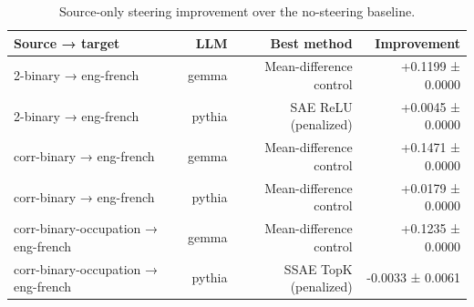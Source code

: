 \begin{table}[t]
\centering
\caption{Source-only steering improvement over the no-steering baseline.}
\label{tab:ood-transfer-improvement}
\begin{tabular}{lrrr}
\toprule
Source → target & LLM & Best method & Improvement \\
\midrule
2-binary → eng-french & gemma & Mean-difference control & +0.1199 ± 0.0000 \\
2-binary → eng-french & pythia & SAE ReLU (penalized) & +0.0045 ± 0.0000 \\
corr-binary → eng-french & gemma & Mean-difference control & +0.1471 ± 0.0000 \\
corr-binary → eng-french & pythia & Mean-difference control & +0.0179 ± 0.0000 \\
corr-binary-occupation → eng-french & gemma & Mean-difference control & +0.1235 ± 0.0000 \\
corr-binary-occupation → eng-french & pythia & SSAE TopK (penalized) & -0.0033 ± 0.0061 \\
\bottomrule
\end{tabular}
\end{table}
